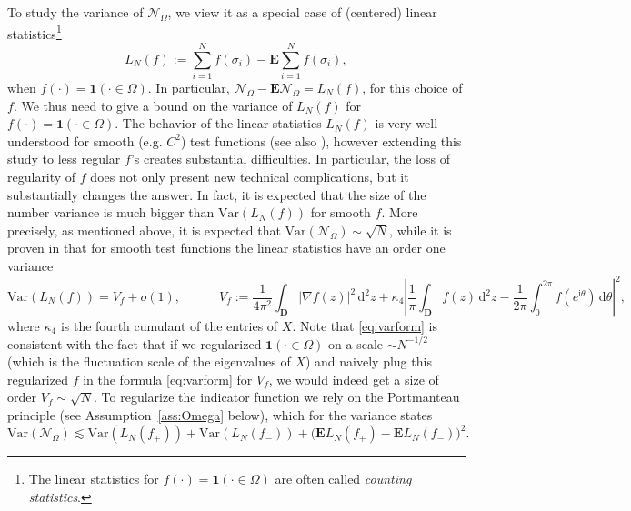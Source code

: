 \documentclass[10pt]{amsart}
\numberwithin{equation}{section}
\newcommand{\dif}{\mathrm{d}}
\newcommand{\E}{\mathbf{E}}
\newcommand{\ii}{\mathrm{i}}
\begin{document}
To study the variance of $\mathcal{N}_\Omega$, we view it as a special case of (centered) linear statistics\footnote{The linear statistics for $f(\cdot)=\bm1(\cdot\in\Omega)$ are often called \emph{counting statistics}.}
\begin{equation}
L_N(f):=\sum_{i=1}^N f(\sigma_i)-\E \sum_{i=1}^N f(\sigma_i),
\end{equation}
when $f(\cdot)=\bm1(\cdot\in\Omega)$. In particular, $\mathcal{N}_\Omega-\E\mathcal{N}_\Omega=L_N(f)$, for this choice of $f$. We thus need to give a bound on the variance of $L_N(f)$ for $f(\cdot)=\bm1(\cdot\in\Omega)$. 
The behavior of the linear statistics $L_N(f)$ is very well understood for smooth (e.g. $C^2$) test functions \cite{macroCLT_complex, macroCLT_real, Cipolloni_meso, kopel2015linear, rider2006gaussian, rider2007noise} (see also \cite{nguyen2014random}), however extending this study to less regular $f$'s creates substantial difficulties. In particular, the loss of regularity of $f$ does not only present new technical complications, but it substantially changes the answer. In fact, it is expected that the size of the number variance is much bigger than $\mathrm{Var}(L_N(f))$ for smooth $f$. More precisely, as mentioned above, it is expected that $\mathrm{Var}(\mathcal{N}_\Omega)\sim \sqrt{N}$, while it is proven in \cite[Theorem~2.2]{macroCLT_complex} that for smooth test functions the linear statistics have an order one variance
\begin{equation}
\label{eq:varform}
\mathrm{Var}(L_N(f))=V_f+o(1), \qquad\quad V_f:=\frac{1}{4\pi^2}\int_\mathbf{D}|\nabla f(z)|^2\,\dif^2 z+\kappa_4 \left|\frac{1}{\pi}\int_\mathbf{D} f(z)\,\dif^2 z-\frac{1}{2\pi}\int_0^{2\pi}f(e^{\ii\theta})\,\dif \theta\right|^2,
\end{equation}
where $\kappa_4$ is the fourth cumulant of the entries of $X$.
Note that \eqref{eq:varform} is consistent with the fact that if we regularized $\bm1(\cdot\in\Omega)$ on a scale $\sim N^{-1/2}$ (which is the fluctuation scale of the eigenvalues of $X$) and naively plug this regularized $f$ in the formula \eqref{eq:varform} for $V_f$, we would indeed get a size of order $V_f \sim \sqrt{N}$.  %
To regularize the indicator function we rely on the Portmanteau principle (see Assumption~\ref{ass:Omega} below), which for the variance states 
\begin{equation}
\label{eq:port}
\mathrm{Var}(\mathcal{N}_\Omega)\lesssim \mathrm{Var}(L_N(f_+))+\mathrm{Var}(L_N(f_-))+\big(\E L_N(f_+)-\E L_N(f_-)\big)^2.
\end{equation}
\end{document}
